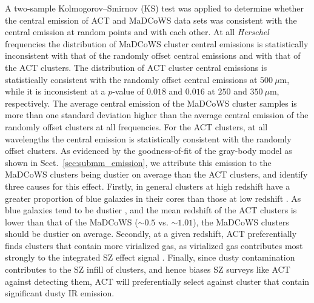 \documentclass[longauth]{aa} %
\newcommand{\micron}{\mbox{{$\mu$}m}\xspace}
\begin{document}
A two-sample Kolmogorov–Smirnov (KS) test was applied to determine whether the central emission of ACT and MaDCoWS data sets was consistent with the central emission at random points and with each other. At all {\it Herschel} frequencies the distribution of MaDCoWS cluster central emissions is statistically inconsistent with that of the randomly offset central emissions and with that of the ACT clusters. The distribution of ACT cluster central emissions is statistically consistent with the randomly offset central emissions at $500~\micron$, while it is inconsistent at a $p$-value of $0.018$ and $0.016$ at $250$ and $350~\micron$, respectively. The average central emission of the MaDCoWS cluster samples is more than one standard deviation higher than the average central emission of the randomly offset clusters at all frequencies. For the ACT clusters, at all wavelengths the central emission is statistically consistent with the randomly offset clusters. As evidenced by the goodness-of-fit of the gray-body model as shown in Sect.~\ref{sec:submm_emission}, we attribute this emission to the MaDCoWS clusters being dustier on average than the ACT clusters, and identify three causes for this effect. Firstly, in general clusters at high redshift have a greater proportion of blue galaxies in their cores than those at low redshift \citep{Butcher1978,Dressler1980, Brodwin2013}. As blue galaxies tend to be dustier \citep{Casey2014}, and the mean redshift of the ACT clusters is lower than that of the MaDCoWS ($\sim0.5$ vs. $\sim1.01$), the MaDCoWS clusters should be dustier on average. Secondly, at a given redshift, ACT preferentially finds clusters that contain more virialized gas, as virialized gas contributes most strongly to the integrated SZ effect signal \citep{Motl2005, Poole2006, Poole2007, Wik2008, Krause2012}. Finally, since dusty contamination contributes to the SZ infill of clusters, and hence biases SZ surveys like ACT against detecting them, ACT will preferentially select against cluster that contain significant dusty IR emission.



\end{document}
